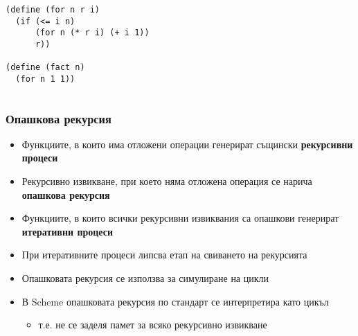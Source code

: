 \documentclass{beamer}
\begin{document}
\begin{frame}[fragile]
\begin{columns}[t,onlytextwidth]
    \scriptsize
\begin{verbatim}
(define (for n r i)
  (if (<= i n)
      (for n (* r i) (+ i 1))
      r))

(define (fact n)
  (for n 1 1))
\end{verbatim}

  \end{columns}
\end{frame}

\begin{frame}
  \frametitle{Опашкова рекурсия}

  \begin{itemize}[<+->]
  \item Функциите, в които има отложени операции генерират същински \textbf{рекурсивни процеси}
  \item Рекурсивно извикване, при което няма отложена операция се нарича \textbf{опашкова рекурсия}
  \item Функциите, в които всички рекурсивни извиквания са опашкови генерират \textbf{итеративни процеси}
  \item При итеративните процеси липсва етап на свиването на рекурсията
  \item Опашковата рекурсия се използва за симулиране на цикли
  \item В Scheme опашковата рекурсия \alert{по стандарт} се интерпретира като цикъл
    \begin{itemize}
    \item т.е. не се заделя памет за всяко рекурсивно извикване
    \end{itemize}
  \end{itemize}
\end{frame}
\end{document}
